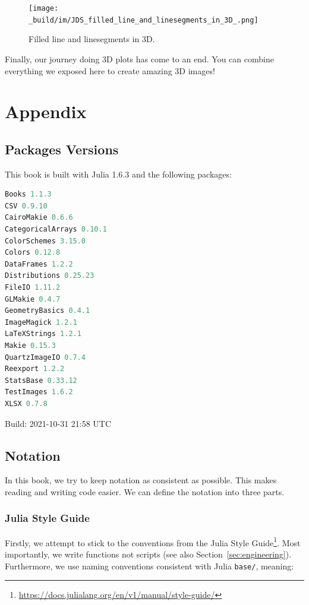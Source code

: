 \documentclass[
  notoc %
]{tufte-book}
\DeclareRobustCommand{\href}[2]{#2\footnote{\url{#1}}}
\newcommand{\passthrough}[1]{#1}
\begin{document}
\begin{figure}
\hypertarget{fig:filled_line_and_linesegments_in_3D}{%
\centering
\texttt{[image: \_build/im/JDS\_filled\_line\_and\_linesegments\_in\_3D\_.png]}
\caption{Filled line and linesegments in
3D.}\label{fig:filled_line_and_linesegments_in_3D}
}
\end{figure}

Finally, our journey doing 3D plots has come to an end. You can combine
everything we exposed here to create amazing 3D images!

\hypertarget{sec:appendix}{%
\chapter{Appendix}\label{sec:appendix}}

\hypertarget{sec:appendix_pkg}{%
\section{Packages Versions}\label{sec:appendix_pkg}}

This book is built with Julia 1.6.3 and the following packages:

\begin{lstlisting}[language=Julia]
Books 1.1.3
CSV 0.9.10
CairoMakie 0.6.6
CategoricalArrays 0.10.1
ColorSchemes 3.15.0
Colors 0.12.8
DataFrames 1.2.2
Distributions 0.25.23
FileIO 1.11.2
GLMakie 0.4.7
GeometryBasics 0.4.1
ImageMagick 1.2.1
LaTeXStrings 1.2.1
Makie 0.15.3
QuartzImageIO 0.7.4
Reexport 1.2.2
StatsBase 0.33.12
TestImages 1.6.2
XLSX 0.7.8
\end{lstlisting}

Build: 2021-10-31 21:58 UTC

\hypertarget{sec:notation}{%
\section{Notation}\label{sec:notation}}

In this book, we try to keep notation as consistent as possible. This
makes reading and writing code easier. We can define the notation into
three parts.

\hypertarget{julia-style-guide}{%
\subsection{Julia Style Guide}\label{julia-style-guide}}

Firstly, we attempt to stick to the conventions from the
\href{https://docs.julialang.org/en/v1/manual/style-guide/}{Julia Style
Guide}. Most importantly, we write functions not scripts (see also
Section~\ref{sec:engineering}). Furthermore, we use naming conventions
consistent with Julia \passthrough{\lstinline!base/!}, meaning:
\end{document}

